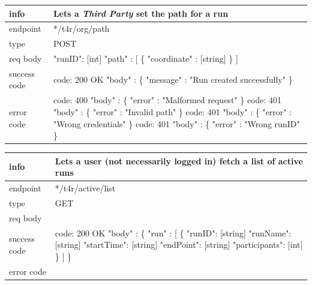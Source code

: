 \documentclass[titlepage]{article}
\begin{document}
	\begin{tabularx}{\textwidth}{lX} \hline
		info & Lets a {\it Third Party} set the path for a run \\ \hline
		endpoint & */t4r/org/path \\ \hline
		type & POST \\ \hline
		req body & 
		"runID": [int] \newline
		"path" : [ \newline
		\{ \newline
		"coordinate" : [string] \newline
		\} \newline
		]
		\\ \hline
		success code &
		code: 200 OK \newline  
		"body" : \{ \newline
		"message" : "Run created successfully" \newline
		\} \\ \hline
		error code &
		code: 400 \newline
		"body" : \{ "error" : "Malformed request" \} \newline \newline
		code: 401 \newline
		"body" : \{ "error" : "Invalid path" \} \newline \newline
		code: 401 \newline
		"body" : \{ "error" : "Wrong credentials" \} \newline \newline
		code: 401 \newline
		"body" : \{ "error" : "Wrong runID" \} \\\hline
	\end{tabularx}
	
	\vspace{\baselineskip}
	
	\begin{tabularx}{\textwidth}{lX} \hline
		info & Lets a user (not necessarily logged in) fetch a list of active runs \\ \hline
		endpoint & */t4r/active/list \\ \hline
		type & GET \\ \hline
		req body & \\ \hline
		success code &
		code: 200 OK \newline  
		"body" : \{ \newline
		"run" : [ \{ \newline
		"runID": [string] \newline
		"runName": [string] \newline
		"startTime": [string] \newline
		"endPoint": [string] \newline
		"participants": [int] \newline
		\} ] \newline
		\} \\ \hline
		error code & \\ \hline
	\end{tabularx}
	
\end{document}
